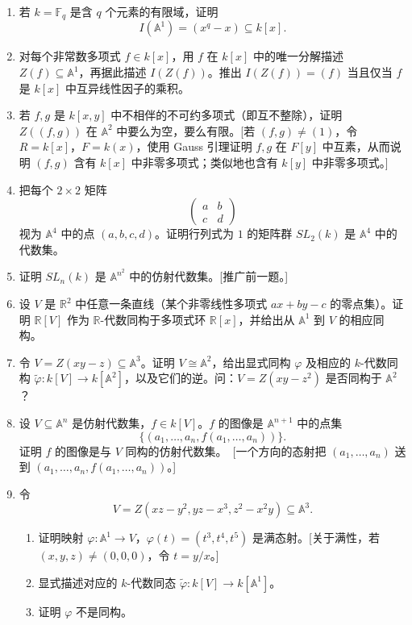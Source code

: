 \begin{enumerate}[label=\arabic*.]
	\item 若 $k=\mathbb F_q$ 是含 $q$ 个元素的有限域，证明
	\[
	I(\mathbb A^1)=(x^q-x)\subseteq k[x].
	\]
	
	\item 对每个非常数多项式 $f\in k[x]$，用 $f$ 在 $k[x]$ 中的唯一分解描述 $Z(f)\subseteq\mathbb A^1$，再据此描述 $I(Z(f))$。推出 $I(Z(f))=(f)$ 当且仅当 $f$ 是 $k[x]$ 中互异线性因子的乘积。
	
	\item 若 $f,g$ 是 $k[x,y]$ 中不相伴的不可约多项式（即互不整除），证明 $Z((f,g))$ 在 $\mathbb A^2$ 中要么为空，要么有限。[若 $(f,g)\ne(1)$，令 $R=k[x]$，$F=k(x)$，使用 Gauss 引理证明 $f,g$ 在 $F[y]$ 中互素，从而说明 $(f,g)$ 含有 $k[x]$ 中非零多项式；类似地也含有 $k[y]$ 中非零多项式。]
	
	\item 把每个 $2\times2$ 矩阵
	\[
	\begin{pmatrix}a&b\\ c&d\end{pmatrix}
	\]
	视为 $\mathbb A^4$ 中的点 $(a,b,c,d)$。证明行列式为 $1$ 的矩阵群 $SL_2(k)$ 是 $\mathbb A^4$ 中的代数集。
	
	\item 证明 $SL_n(k)$ 是 $\mathbb A^{n^2}$ 中的仿射代数集。[推广前一题。]
	
	\item 设 $V$ 是 $\mathbb R^2$ 中任意一条直线（某个非零线性多项式 $ax+by-c$ 的零点集）。证明 $\mathbb R[V]$ 作为 $\mathbb R$-代数同构于多项式环 $\mathbb R[x]$，并给出从 $\mathbb A^1$ 到 $V$ 的相应同构。
	
	\item 令 $V=Z(xy-z)\subseteq\mathbb A^3$。证明 $V\cong\mathbb A^2$，给出显式同构 $\varphi$ 及相应的 $k$-代数同构 $\widetilde\varphi:k[V]\to k[\mathbb A^2]$，以及它们的逆。问：$V=Z(xy-z^2)$ 是否同构于 $\mathbb A^2$？
	
	\item 设 $V\subseteq\mathbb A^n$ 是仿射代数集，$f\in k[V]$。$f$ 的图像是 $\mathbb A^{n+1}$ 中的点集
	\[
	\{(a_1,
	\ldots,a_n,f(a_1,
	\ldots,a_n))\}.
	\]
	证明 $f$ 的图像是与 $V$ 同构的仿射代数集。\linebreak\ [一个方向的态射把 $(a_1,
	\ldots,a_n)$ 送到 $(a_1,
	\ldots,a_n,f(a_1,
	\ldots,a_n))$。]
	
	\item 令
	\[
	V=Z(xz-y^2,
	yz-x^3,
	z^2-x^2y)\subseteq\mathbb A^3.
	\]
	\begin{enumerate}[label=(\alph*)]
		\item 证明映射 $\varphi:\mathbb A^1\to V$，$\varphi(t)=(t^3,t^4,t^5)$ 是满态射。[关于满性，若 $(x,y,z)\ne(0,0,0)$，令 $t=y/x$。]
		\item 显式描述对应的 $k$-代数同态 $\widetilde\varphi:k[V]\to k[\mathbb A^1]$。
		\item 证明 $\varphi$ 不是同构。
	\end{enumerate}
	

\end{enumerate}
